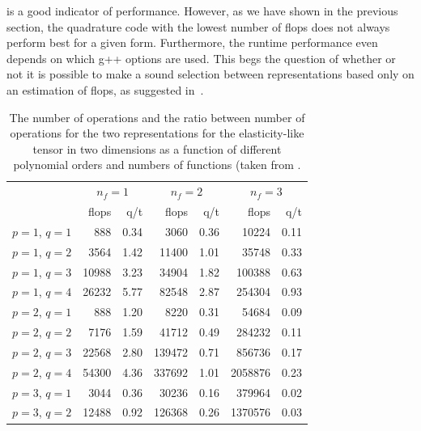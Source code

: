 is a good indicator of performance.  However, as we have shown in
the previous section, the quadrature code with the lowest number of
flops does not always perform best for a given form. Furthermore,
the runtime performance even depends on which g++ options are used.
This begs the question of whether or not it is possible to make a sound
selection between representations based only on an estimation of flops,
as suggested in~\citet{OelgaardWells2010}.
%
\begin{table}
\caption{The number of operations and the ratio between number of operations
         for the two representations for the elasticity-like tensor in two
         dimensions as a function of different polynomial orders and numbers of
         functions (taken from \citet{OelgaardWells2010}.}
\label{oelgaard-2:tab:elasticity2D_complex_comparison}
\begin{center}\small
\begin{tabular}{l|rr|rr|rr}
\multicolumn{1}{c}{} & \multicolumn{2}{c}{$n_f = 1$} & \multicolumn{2}{c}{$n_f = 2$} & \multicolumn{2}{c}{$n_f = 3$}\\
                  & flops & q/t          & flops & q/t          & flops & q/t\\
\hline
$p = 1$, $q = 1$  &    888  &  0.34               &    3060 &  0.36               &   10224 & 0.11\\
$p = 1$, $q = 2$  &   3564  &  1.42               &   11400 &  1.01               &   35748 & 0.33\\
$p = 1$, $q = 3$  &  10988  &  3.23               &   34904 &  1.82               &  100388 & 0.63\\
$p = 1$, $q = 4$  &  26232  &  5.77               &   82548 &  2.87               &  254304 & 0.93\\
\hline
$p = 2$, $q = 1$  &    888  &  1.20               &    8220 &  0.31               &   54684 & 0.09\\
$p = 2$, $q = 2$  &   7176  &  1.59               &   41712 &  0.49               &  284232 & 0.11\\
$p = 2$, $q = 3$  &  22568  &  2.80               &  139472 &  0.71               &  856736 & 0.17\\
$p = 2$, $q = 4$  &  54300  &  4.36               &  337692 &  1.01               & 2058876 & 0.23\\
\hline
$p = 3$, $q = 1$  &   3044  &  0.36               &   30236 &  0.16               &  379964 & 0.02\\
$p = 3$, $q = 2$  &  12488  &  0.92               &  126368 &  0.26               & 1370576 & 0.03\\

\end{tabular}
\end{center}
\end{table}
